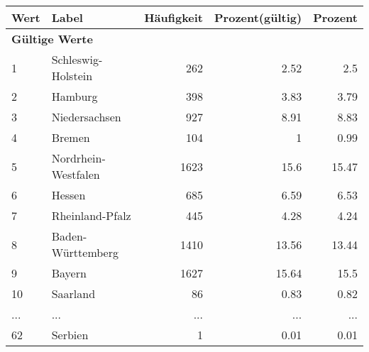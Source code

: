      \begin{longtable}{lXrrr}
     \toprule
     \textbf{Wert} & \textbf{Label} & \textbf{Häufigkeit} & \textbf{Prozent(gültig)} & \textbf{Prozent} \\
     \endhead
     \midrule
     \multicolumn{5}{l}{\textbf{Gültige Werte}}\\
        1 & \multicolumn{1}{X}{Schleswig-Holstein} & %
          \num{262} &
          \num[round-mode=places,round-precision=2]{2.52} &
          \num[round-mode=places,round-precision=2]{2.5} \\
        2 & \multicolumn{1}{X}{Hamburg} & %
          \num{398} &
          \num[round-mode=places,round-precision=2]{3.83} &
          \num[round-mode=places,round-precision=2]{3.79} \\
        3 & \multicolumn{1}{X}{Niedersachsen} & %
          \num{927} &
          \num[round-mode=places,round-precision=2]{8.91} &
          \num[round-mode=places,round-precision=2]{8.83} \\
        4 & \multicolumn{1}{X}{Bremen} & %
          \num{104} &
          \num[round-mode=places,round-precision=2]{1} &
          \num[round-mode=places,round-precision=2]{0.99} \\
        5 & \multicolumn{1}{X}{Nordrhein-Westfalen} & %
          \num{1623} &
          \num[round-mode=places,round-precision=2]{15.6} &
          \num[round-mode=places,round-precision=2]{15.47} \\
        6 & \multicolumn{1}{X}{Hessen} & %
          \num{685} &
          \num[round-mode=places,round-precision=2]{6.59} &
          \num[round-mode=places,round-precision=2]{6.53} \\
        7 & \multicolumn{1}{X}{Rheinland-Pfalz} & %
          \num{445} &
          \num[round-mode=places,round-precision=2]{4.28} &
          \num[round-mode=places,round-precision=2]{4.24} \\
        8 & \multicolumn{1}{X}{Baden-Württemberg} & %
          \num{1410} &
          \num[round-mode=places,round-precision=2]{13.56} &
          \num[round-mode=places,round-precision=2]{13.44} \\
        9 & \multicolumn{1}{X}{Bayern} & %
          \num{1627} &
          \num[round-mode=places,round-precision=2]{15.64} &
          \num[round-mode=places,round-precision=2]{15.5} \\
        10 & \multicolumn{1}{X}{Saarland} & %
          \num{86} &
          \num[round-mode=places,round-precision=2]{0.83} &
          \num[round-mode=places,round-precision=2]{0.82} \\
       ... & ... & ... & ... & ... \\
        62 & \multicolumn{1}{X}{Serbien} & %
          \num{1} &
          \num[round-mode=places,round-precision=2]{0.01} &
          \num[round-mode=places,round-precision=2]{0.01} \\


\end{longtable}
